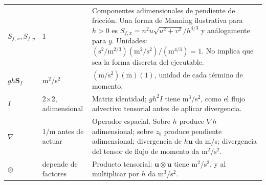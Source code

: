 \documentclass[11pt,a4paper]{article}
\begin{document}
\begin{longtable}{p{.17\linewidth}p{.18\linewidth}p{.57\linewidth}}
$S_{f,x},S_{f,y}$ & 1 & Componentes adimensionales de pendiente de fricción. Una forma de Manning ilustrativa para $h>0$ es $S_{f,x}=n^2u\sqrt{u^2+v^2}/h^{4/3}$ y análogamente para $y$. Unidades: $(\mathrm{s^2/m^{2/3}})(\mathrm{m^2/s^2})/(\mathrm{m^{4/3}})=1$. No implica que sea la forma discreta del ejecutable. \\
$gh\boldsymbol S_f$ & m$^2$/s$^2$ & $(\mathrm{m/s^2})(\mathrm m)(1)$, unidad de cada término de momento. \\
$I$ & 2$\times$2, adimensional & Matriz identidad; $gh^2I$ tiene m$^3$/s$^2$, como el flujo advectivo tensorial antes de aplicar divergencia. \\
$\nabla$ & 1/m antes de actuar & Operador espacial. Sobre $h$ produce $\nabla h$ adimensional; sobre $z_b$ produce pendiente adimensional; divergencia de $h\boldsymbol u$ da m/s; divergencia del tensor de flujo de momento da m$^2$/s$^2$. \\
$\otimes$ & depende de factores & Producto tensorial: $\boldsymbol u\otimes\boldsymbol u$ tiene m$^2$/s$^2$, y al multiplicar por $h$ da m$^3$/s$^2$. \\
\bottomrule
\end{longtable}
\end{document}
